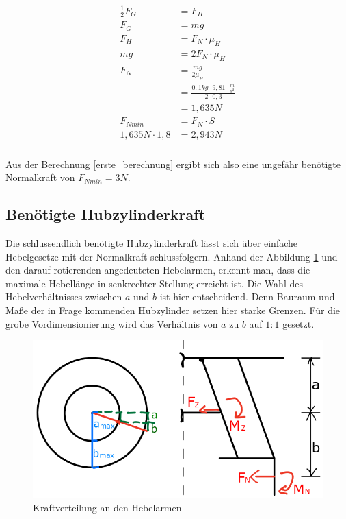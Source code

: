 \begin{eqnarray}
\label{erste_berechnung}
\begin{split}
\frac{1}{2}F_G &= F_H  \\
F_G &= mg \\
F_H &= F_N \cdot \mu_H \\
mg &= 2 F_N \cdot \mu_H \\
F_N &= \frac{mg}{2\mu_H} \\
	&= \frac{0,1kg\cdot9,81\cdot\frac{m}{s^2}}{2\cdot 0,3} \\
	&= 1,635N \\
F_{Nmin} &= F_N\cdot S \\
1,635N\cdot 1,8 &= 2,943N \\
\end{split}
\end{eqnarray}

Aus der Berechnung \eqref{erste_berechnung} ergibt sich also eine ungefähr benötigte Normalkraft von $F_{Nmin} = 3N$.

\subsection{Benötigte Hubzylinderkraft}

Die schlussendlich benötigte Hubzylinderkraft lässt sich über einfache Hebelgesetze mit der Normalkraft schlussfolgern. Anhand der Abbildung \ref{mechanikskizze} und den darauf rotierenden angedeuteten Hebelarmen, erkennt man, dass die maximale Hebellänge in senkrechter Stellung erreicht ist. Die Wahl des Hebelverhältnisses zwischen $a$ und $b$ ist hier entscheidend. Denn Bauraum und Maße der in Frage kommenden Hubzylinder setzen hier starke Grenzen. Für die grobe Vordimensionierung wird das Verhältnis von $a$ zu $b$ auf $1:1$ gesetzt.

\begin{figure}[h]
	\begin{center}
	\includegraphics[scale=0.5]{"Grafiken/Mechanikskizze.png"}
	\caption{Kraftverteilung an den Hebelarmen}
	\label{mechanikskizze}
	\end{center}
\end{figure}

